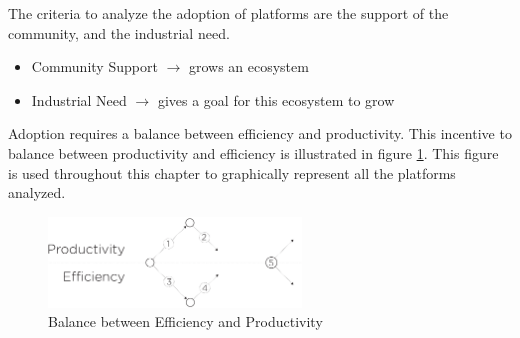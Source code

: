 \separator

The criteria to analyze the adoption of platforms are the support of the community, and the industrial need.

\begin{itemize}
\item Community Support
  \subitem $\to$ grows an ecosystem
\item Industrial Need
  \subitem $\to$ gives a goal for this ecosystem to grow
\end{itemize}

\separator

Adoption requires a balance between efficiency and productivity.
This incentive to balance between productivity and efficiency is illustrated in figure \ref{fig:state-of-the-art}.
This figure is used throughout this chapter to graphically represent all the platforms analyzed.

\begin{figure}[h!]
\begin{center}
\includegraphics[width=0.6\textwidth]{../resources/state-of-the-art.pdf}
\end{center}
\caption{Balance between Efficiency and Productivity}
\label{fig:state-of-the-art}
\end{figure}








